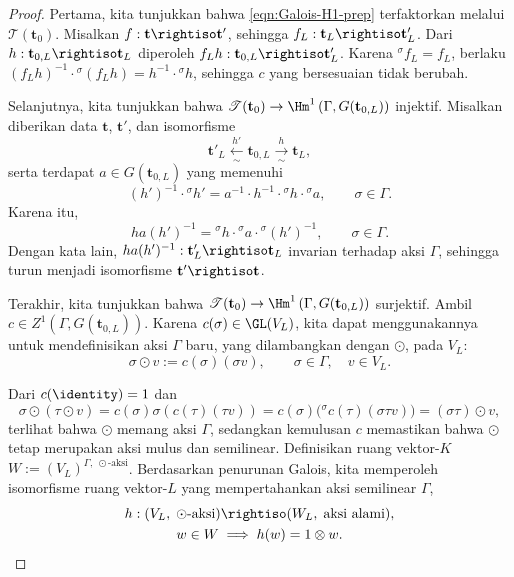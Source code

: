 \begin{proof}
	Pertama, kita tunjukkan bahwa \eqref{eqn:Galois-H1-prep} terfaktorkan melalui
	$\mathscr{T}(\mathbf{t}_0)$. Misalkan
	$f:\mathbf{t}\rightiso\mathbf{t}'$, sehingga
	$f_L:\mathbf{t}_L\rightiso\mathbf{t}'_L$. Dari
	$h:\mathbf{t}_{0,L}\rightiso\mathbf{t}_L$ diperoleh
	$f_Lh:\mathbf{t}_{0,L}\rightiso\mathbf{t}'_L$. Karena
	${}^\sigma f_L=f_L$, berlaku
	$(f_Lh)^{-1}\cdot{}^\sigma(f_Lh)=h^{-1}\cdot{}^\sigma h$, sehingga $c$
	yang bersesuaian tidak berubah.

	Selanjutnya, kita tunjukkan bahwa
	$\mathscr{T}(\mathbf{t}_0)\to
	\Hm^1\left(\Gamma,G(\mathbf{t}_{0,L})\right)$ injektif. Misalkan diberikan
	data $\mathbf{t}$, $\mathbf{t}'$, dan isomorfisme
	\[
	\mathbf{t}'_L\xleftarrow[\sim]{h'}\mathbf{t}_{0,L}
	\xrightarrow[\sim]{h}\mathbf{t}_L,
	\]
	serta terdapat $a\in G(\mathbf{t}_{0,L})$ yang memenuhi
	\[
	(h')^{-1}\cdot{}^\sigma h'
	=a^{-1}\cdot h^{-1}\cdot{}^\sigma h\cdot{}^\sigma a,
	\qquad\sigma\in\Gamma.
	\]
	Karena itu,
	\[
	ha(h')^{-1}
	={}^\sigma h\cdot{}^\sigma a\cdot{}^\sigma(h')^{-1},
	\qquad\sigma\in\Gamma.
	\]
	Dengan kata lain,
	$ha(h')^{-1}:\mathbf{t}'_L\rightiso\mathbf{t}_L$ invarian terhadap aksi
	$\Gamma$, sehingga turun menjadi isomorfisme
	$\mathbf{t}'\rightiso\mathbf{t}$.

	Terakhir, kita tunjukkan bahwa
	$\mathscr{T}(\mathbf{t}_0)\to
	\Hm^1\left(\Gamma,G(\mathbf{t}_{0,L})\right)$ surjektif. Ambil
	$c\in Z^1(\Gamma,G(\mathbf{t}_{0,L}))$. Karena
	$c(\sigma)\in\GL(V_L)$, kita dapat menggunakannya untuk mendefinisikan
	aksi $\Gamma$ baru, yang dilambangkan dengan $\odot$, pada $V_L$:
	\[
	\sigma\odot v:=c(\sigma)(\sigma v),
	\qquad\sigma\in\Gamma,\quad v\in V_L.
	\]

	Dari $c(\identity)=1$ dan
	\[
	\sigma\odot(\tau\odot v)
	=c(\sigma)\sigma(c(\tau)(\tau v))
	=c(\sigma)\bigl({}^\sigma c(\tau)(\sigma\tau v)\bigr)
	=(\sigma\tau)\odot v,
	\]
	terlihat bahwa $\odot$ memang aksi $\Gamma$, sedangkan kemulusan $c$
	memastikan bahwa $\odot$ tetap merupakan aksi mulus dan semilinear.
	Definisikan ruang vektor-$K$
	$W:=(V_L)^{\Gamma,\;\odot\text{-aksi}}$. Berdasarkan penurunan Galois,
	kita memperoleh isomorfisme ruang vektor-$L$ yang mempertahankan aksi
	semilinear $\Gamma$,
	\begin{gather*}
		h:(V_L,\;\odot\text{-aksi})\rightiso
		(W_L,\;\text{aksi alami}),\\
		w\in W\implies h(w)=1\otimes w.
	\end{gather*}


\end{proof}
